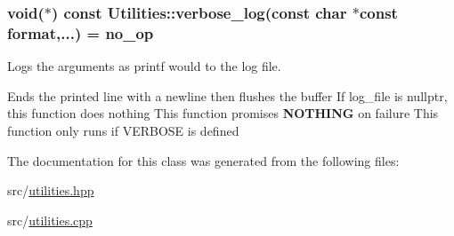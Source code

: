 \subsubsection[{\texorpdfstring{verbose\+\_\+log}{verbose_log}}]{\setlength{\rightskip}{0pt plus 5cm}void($\ast$) const Utilities\+::verbose\+\_\+log(const char $\ast$const format,...) = {\bf no\+\_\+op}\hspace{0.3cm}{\ttfamily [static]}}\hypertarget{class_utilities_aea2455488648f9acb6f72dea878b3782}{}\label{class_utilities_aea2455488648f9acb6f72dea878b3782}


Logs the arguments as printf would to the log file. 

Ends the printed line with a newline then flushes the buffer If log\+\_\+file is nullptr, this function does nothing This function promises {\bfseries N\+O\+T\+H\+I\+NG} on failure This function only runs if V\+E\+R\+B\+O\+SE is defined 

The documentation for this class was generated from the following files\+:\begin{DoxyCompactItemize}
\item 
src/\hyperlink{utilities_8hpp}{utilities.\+hpp}\item 
src/\hyperlink{utilities_8cpp}{utilities.\+cpp}\end{DoxyCompactItemize}
